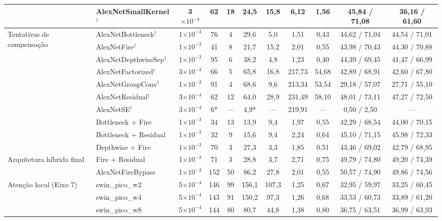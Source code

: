 \documentclass[conference]{IEEEtran}
\begin{document}
\begin{table}[!t]
{\begin{tabular}{@{}llccccccccc@{}}
 & AlexNetSmallKernel$^\dagger$ & 3$\times10^{-4}$ & 62 & 18 & 24,5 & 15,8 & 6,12 & 1,56 & 45,84 / 71,08 & 36,16 / 61,60 \\
\midrule
\multirow{10}{*}{Tentativas de compensação}
 & AlexNetBottleneck$^\dagger$ & 1$\times10^{-3}$ & 76 & 4 & 29,6 & 5,0 & 1,51 & 0,43 & 44,62 / 71,04 & 44,54 / 71,01 \\
 & AlexNetFire$^\dagger$ & 1$\times10^{-3}$ & 41 & 8 & 21,7 & 15,2 & 2,01 & 0,55 & 43,98 / 70,43 & 44,30 / 70,88 \\
 & AlexNetDepthwiseSep$^\dagger$ & 1$\times10^{-3}$ & 95 & 6 & 38,2 & 4,8 & 1,23 & 0,40 & 44,39 / 69,45 & 41,47 / 66,99 \\
 & AlexNetFactorized$^\dagger$ & 3$\times10^{-4}$ & 66 & 5 & 65,8 & 16,8 & 217,73 & 54,68 & 42,89 / 68,91 & 42,60 / 67,80 \\
 & AlexNetGroupConv$^\dagger$ & 1$\times10^{-3}$ & 91 & 4 & 68,6 & 9,6 & 213,34 & 53,54 & 29,18 / 57,07 & 27,71 / 55,10 \\
 & AlexNetResidual$^\dagger$ & 3$\times10^{-4}$ & 62 & 12 & 64,0 & 28,9 & 231,49 & 58,10 & 48,01 / 73,11 & 47,27 / 72,50 \\
 & AlexNetSE$^\dagger$ & 3$\times10^{-4}$ & 6* & — & 4,9* & — & 219,91 & — & 0,50 / 2,50 & — \\
 & Bottleneck + Fire & 1$\times10^{-3}$ & 34 & 13 & 13,9 & 9,4 & 1,97 & 0,55 & 42,29 / 68,54 & 44,00 / 70,15 \\
 & Bottleneck + Residual & 1$\times10^{-3}$ & 32 & 9 & 15,6 & 9,4 & 2,24 & 0,64 & 45,10 / 71,15 & 45,98 / 72,33 \\
 & Depthwise + Fire & 1$\times10^{-3}$ & 70 & 3 & 27,3 & 3,3 & 1,85 & 0,51 & 43,46 / 69,02 & 42,79 / 68,95 \\
\midrule
\multirow{2}{*}{Arquitetura híbrida final}
 & Fire + Residual & 1$\times10^{-3}$ & 71 & 3 & 28,8 & 3,7 & 2,71 & 0,75 & 49,79 / 74,80 & 49,20 / 74,39 \\
 & AlexNetFireBypass & 1$\times10^{-3}$ & 152 & 50 & 86,2 & 27,8 & 2,01 & 0,55 & 50,57 / 74,90 & 49,86 / 74,56 \\
\midrule
\multirow{9}{*}{Atenção local (Eixo 7)}
 & swin\_pico\_w2 & 5$\times10^{-4}$ & 146 & 99 & 156,1 & 107,3 & 1,25 & 0,67 & 32,95 / 59,97 & 33,25 / 60,45 \\
 & swin\_pico\_w4 & 5$\times10^{-4}$ & 143 & 91 & 150,2 & 97,3 & 1,26 & 0,68 & 33,53 / 60,73 & 33,89 / 61,20 \\
 & swin\_pico\_w8 & 5$\times10^{-4}$ & 144 & 80 & 80,7 & 44,8 & 1,38 & 0,80 & 36,75 / 63,51 & 36,99 / 63,93 \\

\end{tabular}}
\end{table}
\end{document}
